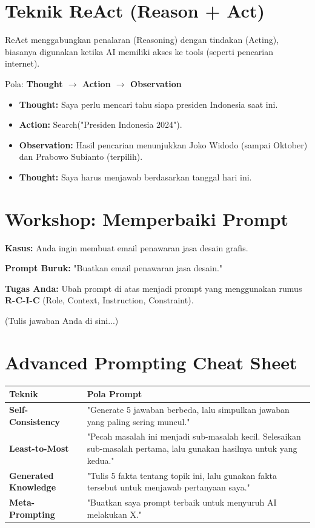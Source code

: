 \section{Teknik ReAct (Reason + Act)}

ReAct menggabungkan penalaran (Reasoning) dengan tindakan (Acting), biasanya digunakan ketika AI memiliki akses ke tools (seperti pencarian internet).

Pola: \textbf{Thought $\rightarrow$ Action $\rightarrow$ Observation}

\begin{itemize}
    \item \textbf{Thought:} Saya perlu mencari tahu siapa presiden Indonesia saat ini.
    \item \textbf{Action:} Search("Presiden Indonesia 2024").
    \item \textbf{Observation:} Hasil pencarian menunjukkan Joko Widodo (sampai Oktober) dan Prabowo Subianto (terpilih).
    \item \textbf{Thought:} Saya harus menjawab berdasarkan tanggal hari ini.
\end{itemize}

\section{Workshop: Memperbaiki Prompt}

\begin{exercisebox}
\textbf{Kasus:} Anda ingin membuat email penawaran jasa desain grafis.

\textbf{Prompt Buruk:}
"Buatkan email penawaran jasa desain."

\textbf{Tugas Anda:}
Ubah prompt di atas menjadi prompt yang menggunakan rumus \textbf{R-C-I-C} (Role, Context, Instruction, Constraint).

\vspace{2cm} %
(Tulis jawaban Anda di sini...)
\end{exercisebox}

\section{Advanced Prompting Cheat Sheet}

\begin{center}
\begin{tabular}{|p{4cm}|p{8cm}|}
\hline
\textbf{Teknik} & \textbf{Pola Prompt} \\
\hline
\textbf{Self-Consistency} & "Generate 5 jawaban berbeda, lalu simpulkan jawaban yang paling sering muncul." \\
\hline
\textbf{Least-to-Most} & "Pecah masalah ini menjadi sub-masalah kecil. Selesaikan sub-masalah pertama, lalu gunakan hasilnya untuk yang kedua." \\
\hline
\textbf{Generated Knowledge} & "Tulis 5 fakta tentang topik ini, lalu gunakan fakta tersebut untuk menjawab pertanyaan saya." \\
\hline
\textbf{Meta-Prompting} & "Buatkan saya prompt terbaik untuk menyuruh AI melakukan X." \\
\hline
\end{tabular}
\end{center}
